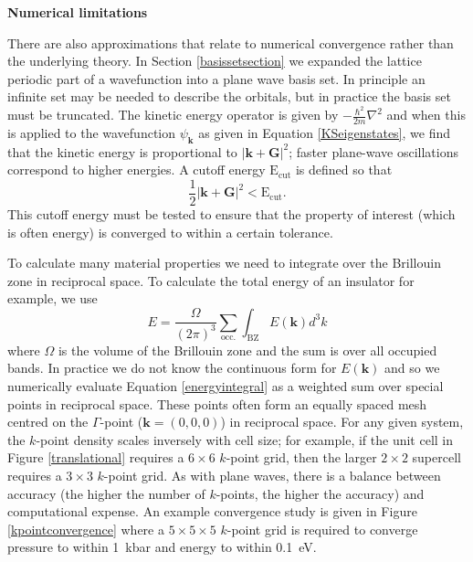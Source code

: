 \textbf{Numerical limitations} 

There are also approximations that relate to numerical convergence rather than the underlying theory.
In Section \ref{basissetsection} we expanded the lattice periodic part of a wavefunction into a plane wave basis set. In principle an infinite set may be needed to describe the orbitals, but in practice the basis set must be truncated. The kinetic energy operator is given by $-\frac{\hbar^2 }{2m}\nabla^2$ and when this is applied to the wavefunction $\psi_\mathbf{k}$ as given in Equation \ref{KSeigenstates}, we find that the kinetic energy is proportional to $|\mathbf{k}+\mathbf{G}|^2$; faster plane-wave oscillations correspond to higher energies. A cutoff energy $\textrm{E}_\textrm{cut}$ is defined so that
\begin{equation}
\frac{1}{2}|\mathbf{k}+\mathbf{G}|^2 < \textrm{E}_\textrm{cut}.
\end{equation}
This cutoff energy must be tested to ensure that the property of interest (which is often energy) is converged to within a certain tolerance.

To calculate many material properties we need to integrate over the Brillouin zone in reciprocal space. To calculate the total energy of an insulator for example, we use
\begin{equation} \label{energyintegral}
    E = \frac{\Omega}{(2\pi)^3}\sum_\textrm{occ.}\int_\textrm{BZ}E(\textbf{k})d^3k
\end{equation}
where $\Omega$ is the volume of the Brillouin zone and the sum is over all occupied bands. 
In practice we do not know the continuous form for $E(\textbf{k})$ and so we numerically evaluate Equation \ref{energyintegral} as a weighted sum over special points in reciprocal space. These points often form an equally spaced mesh centred on the $\Gamma$-point ($\textbf{k}=(0,0,0)$) in reciprocal space. For any given system, the $k$-point density scales inversely with cell size; for example, if the unit cell in Figure \ref{translational} requires a $6\times6$ $k$-point grid, then the larger $2\times2$ supercell requires a $3\times3$ $k$-point grid. As with plane waves, there is a balance between accuracy (the higher the number of $k$-points, the higher the accuracy) and computational expense. An example convergence study is given in Figure \ref{kpointconvergence} where a $5\times5\times5$ $k$-point grid is required to converge pressure to within \SI{1}{\kilo\bar} and energy to within \SI{0.1}{\electronvolt}.

